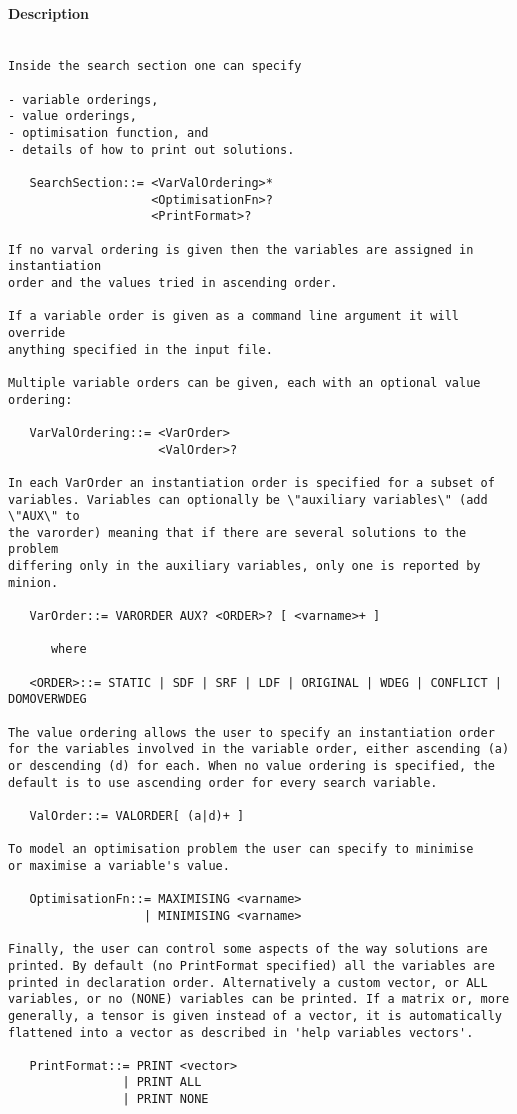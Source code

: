 \paragraph{Description}
{\footnotesize
\begin{verbatim}

Inside the search section one can specify

- variable orderings, 
- value orderings,
- optimisation function, and
- details of how to print out solutions.

   SearchSection::= <VarValOrdering>*
                    <OptimisationFn>?
                    <PrintFormat>?

If no varval ordering is given then the variables are assigned in instantiation
order and the values tried in ascending order.

If a variable order is given as a command line argument it will override
anything specified in the input file.

Multiple variable orders can be given, each with an optional value ordering:

   VarValOrdering::= <VarOrder> 
                     <ValOrder>?

In each VarOrder an instantiation order is specified for a subset of
variables. Variables can optionally be \"auxiliary variables\" (add \"AUX\" to
the varorder) meaning that if there are several solutions to the problem
differing only in the auxiliary variables, only one is reported by minion.

   VarOrder::= VARORDER AUX? <ORDER>? [ <varname>+ ]

      where

   <ORDER>::= STATIC | SDF | SRF | LDF | ORIGINAL | WDEG | CONFLICT | DOMOVERWDEG

The value ordering allows the user to specify an instantiation order
for the variables involved in the variable order, either ascending (a)
or descending (d) for each. When no value ordering is specified, the
default is to use ascending order for every search variable.

   ValOrder::= VALORDER[ (a|d)+ ]

To model an optimisation problem the user can specify to minimise
or maximise a variable's value.

   OptimisationFn::= MAXIMISING <varname>
                   | MINIMISING <varname>

Finally, the user can control some aspects of the way solutions are
printed. By default (no PrintFormat specified) all the variables are
printed in declaration order. Alternatively a custom vector, or ALL
variables, or no (NONE) variables can be printed. If a matrix or, more
generally, a tensor is given instead of a vector, it is automatically
flattened into a vector as described in 'help variables vectors'.

   PrintFormat::= PRINT <vector>
                | PRINT ALL
                | PRINT NONE
\end{verbatim}
}
